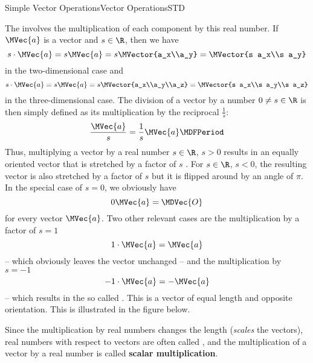 \begin{MXContent}{Simple Vector Operations}{Vector Operations}{STD}
\begin{MInfo}
The  involves
the multiplication of each component by this real number. If $\MVec{a}$ is a vector and $s\in\R$, then we have
\[
 s\cdot\MVec{a} = s\MVec{a}=s\MVector{a_x\\a_y} = \MVector{s a_x\\s a_y}
\]
in the two-dimensional case and
\[
 s\cdot\MVec{a} = s\MVec{a}=s\MVector{a_x\\a_y\\a_z} = \MVector{s a_x\\s a_y\\s a_z}
\]
in the three-dimensional case. The division of a vector by a number $0\neq s\in\R$ is then simply defined as its multiplication
by the reciprocal $\frac{1}{s}$:
\[
 \frac{\MVec{a}}{s}=\frac{1}{s}\MVec{a}\MDFPeriod 
\]
Thus, multiplying a vector by a real number $s\in\R$, $s>0$ results in an equally oriented vector that is stretched by a factor 
of $s$ . For $s\in\R$, $s<0$, the resulting vector is also stretched by a factor of $s$ but it is flipped around by an angle of $\pi$.
In the special case of $s=0$, we obviously have \[0\MVec{a}=\MDVec{O}\] for every vector $\MVec{a}$. Two other relevant cases are the multiplication by a factor of $s=1$
\[1\cdot\MVec{a}=\MVec{a}\]
 -- which obviously leaves the vector unchanged -- and the multiplication by $s=-1$
\[-1\cdot\MVec{a}=-\MVec{a}\]
 -- which results in the so called . This is a vector of 
equal length and opposite orientation. This is illustrated in the figure below.
\begin{center}
% 
\end{center}
Since the multiplication by real numbers changes the length (\textit{scales}
the vectors), real numbers with respect to vectors are often called , and the 
multiplication of a vector by a real number is called \textbf{scalar multiplication}. 
\end{MInfo}


\end{MXContent}
